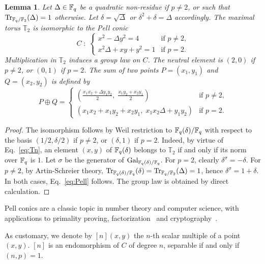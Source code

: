\documentclass{sig-alternate}
\newtheorem{lemma}[definition]{Lemma}
\begin{document}
\begin{lemma}
  Let $\Delta\in\mathbb{F}_q$ be a quadratic non-residue if $p\ne2$, or such
  that $\operatorname{Tr}_{\mathbb{F}_q/\mathbb{F}_2}(\Delta)=1$ otherwise. Let $\delta=\sqrt{\Delta}$
  or $\delta^2+\delta=\Delta$ accordingly. The
  maximal torus $\mathbb{T}_2$ is isomorphic to the \emph{Pell conic}
  \begin{equation}
    \label{eq:Pell}
    C \;:\; 
    \begin{cases}
      x^2 - \Delta y^2 = 4 &\text{if $p\ne2$,}\\
      x^2\Delta + xy + y^2 = 1 &\text{if $p=2$.}
    \end{cases}
  \end{equation}
  Multiplication in $\mathbb{T}_2$ induces a group law on $C$. The neutral
  element is $(2,0)$ if $p\ne2$, or $(0,1)$ if $p=2$. The sum of two
  points $P=(x_1,y_1)$ and $Q=(x_2,y_2)$ is defined
  by
  \begin{equation*}
    P\oplus Q =
    \begin{cases}
      \displaystyle
      \left(\frac{x_1x_2 + \Delta y_1y_2}{2},\; \frac{x_1y_2 + x_2y_1}{2}\right) &
      \text{if $p\ne2$,}\\
      \left(x_1x_2 + x_1y_2 + x_2y_1,\; x_1x_2\Delta + y_1y_2\right) &
      \text{if $p=2$.}
    \end{cases}
  \end{equation*}
\end{lemma}
\begin{proof}
  The isomorphism follows by Weil restriction to $\mathbb{F}_q(\delta)/\mathbb{F}_q$
  with respect to the basis $(1/2,\delta/2)$ if $p\ne2$, or
  $(\delta,1)$ if $p=2$. Indeed, by virtue of Eq.~\eqref{eq:Tn}, an
  element $(x,y)$ of $\mathbb{F}_q(\delta)$ belongs to $\mathbb{T}_2$ if and only if
  its norm over $\mathbb{F}_q$ is $1$.
  Let $\sigma$ be the generator of $\operatorname{Gal}_{\mathbb{F}_q(\delta)/\mathbb{F}_q}$. For
  $p=2$, clearly $\delta^\sigma=-\delta$. For $p\ne2$, by
  Artin-Schreier theory,
  $\operatorname{Tr}_{\mathbb{F}_q(\delta)/\mathbb{F}_q}(\delta)=\operatorname{Tr}_{\mathbb{F}_q/\mathbb{F}_2}(\Delta)=1$, hence
  $\delta^\sigma=1+\delta$. In both cases, Eq.~\eqref{eq:Pell}
  follows.  The group law is obtained by direct calculation.
\end{proof}

Pell conics are a classic topic in number theory\cite{lenstra02-pell}
and computer science, with applications to primality proving,
factorization~\cite{lemmermeyer03,hambleton12} and
cryptography~\cite{rubin-silverberg+crypto03}. 

As customary, we denote by $[n](x,y)$ the $n$-th scalar multiple of a
point $(x,y)$.  $[n]$ is an endomorphism of $C$ of degree
$n$, separable if and only if $(n,p)=1$.
\end{document}
